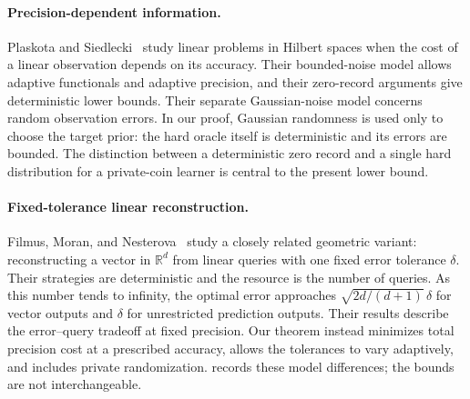 \documentclass[11pt,a4paper]{article}
\newcommand{\R}{\mathbb R}
\theoremstyle{definition}
\theoremstyle{remark}
\begin{document}
\paragraph{Precision-dependent information.}
Plaskota and Siedlecki~\cite{PS23} study linear problems in Hilbert spaces when the cost of a linear observation depends on its accuracy. Their bounded-noise model allows adaptive functionals and adaptive precision, and their zero-record arguments give deterministic lower bounds. Their separate Gaussian-noise model concerns random observation errors. In our proof, Gaussian randomness is used only to choose the target prior: the hard oracle itself is deterministic and its errors are bounded. The distinction between a deterministic zero record and a single hard distribution for a private-coin learner is central to the present lower bound.

\paragraph{Fixed-tolerance linear reconstruction.}
Filmus, Moran, and Nesterova~\cite{FMN26} study a closely related geometric variant: reconstructing a vector in $\R^d$ from linear queries with one fixed error tolerance $\delta$. Their strategies are deterministic and the resource is the number of queries. As this number tends to infinity, the optimal error approaches $\sqrt{2d/(d+1)}\,\delta$ for vector outputs and $\delta$ for unrestricted prediction outputs. Their results describe the error--query tradeoff at fixed precision. Our theorem instead minimizes total precision cost at a prescribed accuracy, allows the tolerances to vary adaptively, and includes private randomization.  records these model differences; the bounds are not interchangeable.
\end{document}
